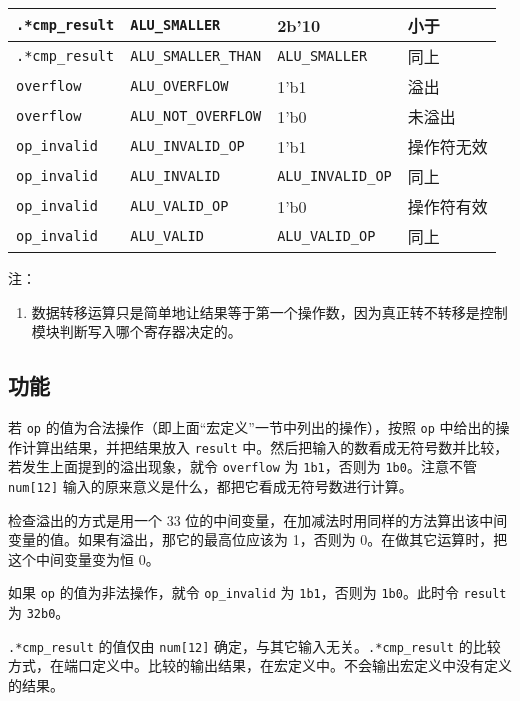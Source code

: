 \documentclass[12pt,AutoFakeBold,AutoFakeSlant]{article}
\providecommand{\tightlist}{%
  \setlength{\itemsep}{0pt}\setlength{\parskip}{0pt}}
\begin{document}
\begin{longtable}[]{@{}|l|l|l|l|@{}}
\texttt{.*cmp\_result} & \texttt{ALU\_SMALLER} & 2b'10 &
小于\tabularnewline\hline
\texttt{.*cmp\_result} & \texttt{ALU\_SMALLER\_THAN} &
\texttt{ALU\_SMALLER} & 同上\tabularnewline\hline
\texttt{overflow} & \texttt{ALU\_OVERFLOW} & 1'b1 & 溢出\tabularnewline\hline
\texttt{overflow} & \texttt{ALU\_NOT\_OVERFLOW} & 1'b0 &
未溢出\tabularnewline\hline
\texttt{op\_invalid} & \texttt{ALU\_INVALID\_OP} & 1'b1 &
操作符无效\tabularnewline\hline
\texttt{op\_invalid} & \texttt{ALU\_INVALID} & \texttt{ALU\_INVALID\_OP}
& 同上\tabularnewline\hline
\texttt{op\_invalid} & \texttt{ALU\_VALID\_OP} & 1'b0 &
操作符有效\tabularnewline\hline
\texttt{op\_invalid} & \texttt{ALU\_VALID} & \texttt{ALU\_VALID\_OP} &
同上\tabularnewline\hline

\end{longtable}

注：

\begin{enumerate}
\def\labelenumi{\arabic{enumi}.}
\tightlist
\item
  数据转移运算只是简单地让结果等于第一个操作数，因为真正转不转移是控制模块判断写入哪个寄存器决定的。
\end{enumerate}

\hypertarget{ux529fux80fd-7}{%
\subsection{功能}\label{ux529fux80fd-7}}

若 \texttt{op} 的值为合法操作（即上面``宏定义''一节中列出的操作），按照
\texttt{op} 中给出的操作计算出结果，并把结果放入 \texttt{result}
中。然后把输入的数看成无符号数并比较，若发生上面提到的溢出现象，就令
\texttt{overflow} 为 \texttt{1\textquotesingle{}b1}，否则为
\texttt{1\textquotesingle{}b0}。注意不管 \texttt{num{[}12{]}}
输入的原来意义是什么，都把它看成无符号数进行计算。

检查溢出的方式是用一个 33
位的中间变量，在加减法时用同样的方法算出该中间变量的值。如果有溢出，那它的最高位应该为
1，否则为 0。在做其它运算时，把这个中间变量变为恒 0。

如果 \texttt{op} 的值为非法操作，就令 \texttt{op\_invalid} 为
\texttt{1\textquotesingle{}b1}，否则为
\texttt{1\textquotesingle{}b0}。此时令 \texttt{result} 为
\texttt{32\textquotesingle{}b0}。

\texttt{.*cmp\_result} 的值仅由 \texttt{num{[}12{]}}
确定，与其它输入无关。\texttt{.*cmp\_result}
的比较方式，在端口定义中。比较的输出结果，在宏定义中。不会输出宏定义中没有定义的结果。
\end{document}
